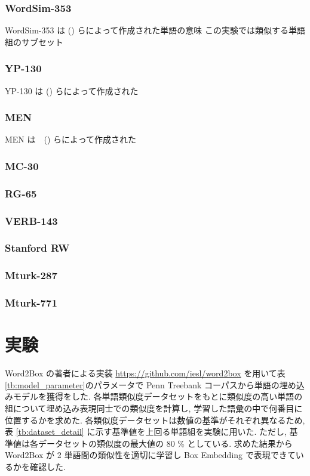 \documentclass[twocolumn]{jarticle}     %
\begin{document}
\subsubsection{WordSim-353}
WordSim-353 は () らによって作成された単語の意味
この実験では類似する単語組のサブセット

\subsubsection{YP-130}
YP-130 は () らによって作成された

\subsubsection{MEN}
MEN は　() らによって作成された

\subsubsection{MC-30}

\subsubsection{RG-65}

\subsubsection{VERB-143}

\subsubsection{Stanford RW}

\subsubsection{Mturk-287}

\subsubsection{Mturk-771}


\section{実験}
Word2Box の著者による実装 \url{https://github.com/iesl/word2box} を用いて表 \ref{tb:model_parameter}のパラメータで Penn Treebank コーパスから単語の埋め込みモデルを獲得をした. 
各単語類似度データセットをもとに類似度の高い単語の組について埋め込み表現同士での類似度を計算し, 学習した語彙の中で何番目に位置するかを求めた. 
各類似度データセットは数値の基準がそれぞれ異なるため, 表 \ref{tb:dataset_detail} に示す基準値を上回る単語組を実験に用いた. 
ただし, 基準値は各データセットの類似度の最大値の 80 \% としている. 
求めた結果から Word2Box が 2 単語間の類似性を適切に学習し Box Embedding で表現できているかを確認した. 
\end{document}
